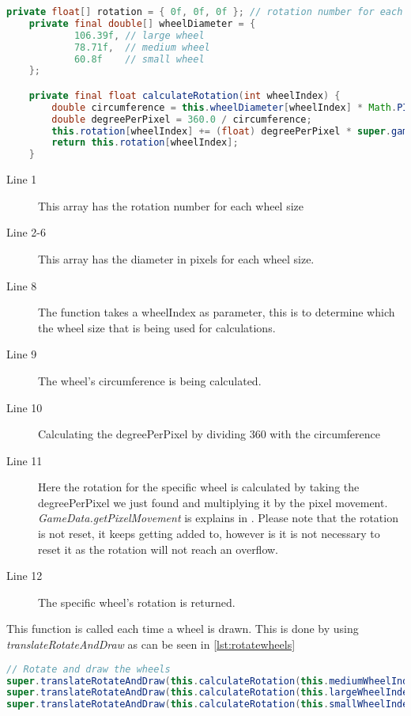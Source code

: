 \begin{lstlisting}[language=java,firstnumber=1,caption={Rotating and drawing the wheels},label=lst:calcrotate]
    private float[] rotation = { 0f, 0f, 0f }; // rotation number for each wheel size
    private final double[] wheelDiameter = {
            106.39f, // large wheel
            78.71f,  // medium wheel
            60.8f    // small wheel
    };

    private final float calculateRotation(int wheelIndex) {    
        double circumference = this.wheelDiameter[wheelIndex] * Math.PI;
        double degreePerPixel = 360.0 / circumference;
        this.rotation[wheelIndex] += (float) degreePerPixel * super.gameData.getPixelMovement();
        return this.rotation[wheelIndex];
    }
\end{lstlisting}

\begin{description}
\item[Line 1] This array has the rotation number for each wheel size
\item[Line 2-6] This array has the diameter in pixels for each wheel size. 
\item[Line 8] The function takes a wheelIndex as parameter, this is to determine which the wheel size that is being used for calculations. 
\item[Line 9] The wheel's circumference is being calculated.
\item[Line 10] Calculating the degreePerPixel by dividing 360 with the circumference
\item[Line 11] Here the rotation for the specific wheel is calculated by taking the degreePerPixel we just found and multiplying it by the pixel movement. \textit{GameData.getPixelMovement} is explains in . Please note that the rotation is not reset, it keeps getting added to, however is it is not necessary to reset it as the rotation will not reach an overflow.
\item[Line 12] The specific wheel's rotation is returned. 
\end{description}

This function is called each time a wheel is drawn. This is done by using \textit{translateRotateAndDraw} as can be seen in \autoref{lst:rotatewheels}

\begin{lstlisting}[language=java,firstnumber=1,caption={Rotating and drawing the wheels},label=lst:rotatewheels]
	// Rotate and draw the wheels
super.translateRotateAndDraw(this.calculateRotation(this.mediumWheelIndex), this.mediumWheel);
super.translateRotateAndDraw(this.calculateRotation(this.largeWheelIndex), this.largeWheel);
super.translateRotateAndDraw(this.calculateRotation(this.smallWheelIndex), this.smallWheel);
\end{lstlisting}

